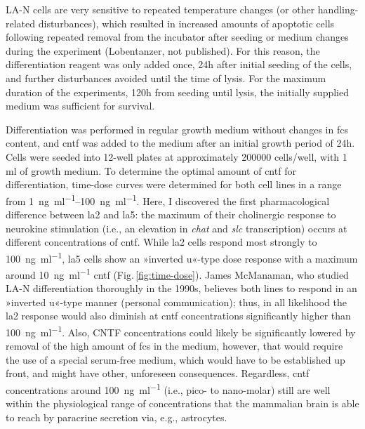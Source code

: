 \begin{method}
LA-N cells are very sensitive to repeated temperature changes (or other handling-related disturbances), which resulted in increased amounts of apoptotic cells following repeated removal from the incubator after seeding or medium changes during the experiment (Lobentanzer, not published). For this reason, the differentiation reagent was only added once, 24h after initial seeding of the cells, and further disturbances avoided until the time of lysis. For the maximum duration of the experiments, 120h from seeding until lysis, the initially supplied medium was sufficient for survival.

Differentiation was performed in regular growth medium without changes in \ac{fcs} content, and \ac{cntf} was added to the medium after an initial growth period of 24h. Cells were seeded into 12-well plates at approximately \num{200000} cells/well, with 1 ml of growth medium. To determine the optimal amount of \ac{cntf} for differentiation, time-dose curves were determined for both cell lines in a range from \SIrange{1}{100}{\nano\gram\per\milli\litre}. Here, I discovered the first pharmacological difference between \ac{la2} and \ac{la5}: the maximum of their cholinergic response to neurokine stimulation (i.e., an elevation in \textit{\ac{chat}} and \textit{\ac{slc}} transcription) occurs at different concentrations of \ac{cntf}. While \ac{la2} cells respond most strongly to \SI{100}{\nano\gram\per\milli\litre}, \ac{la5} cells show an »inverted u«-type dose response with a maximum around \SI{10}{\nano\gram\per\milli\litre} \ac{cntf} (Fig.\,\ref{fig:time-dose}). James McManaman, who studied LA-N differentiation thoroughly in the 1990s\cite{McManaman1991}, believes both lines to respond in an »inverted u«-type manner (personal communication); thus, in all likelihood the \ac{la2} response would also diminish at \ac{cntf} concentrations significantly higher than \SI{100}{\nano\gram\per\milli\litre}. Also, CNTF concentrations could likely be significantly lowered by removal of the high amount of \ac{fcs} in the medium, however, that would require the use of a special serum-free medium, which would have to be established up front, and might have other, unforeseen consequences. Regardless, \ac{cntf} concentrations around \SI{100}{\nano\gram\per\milli\litre} (i.e., pico- to nano-molar) still are well within the physiological range of concentrations that the mammalian brain is able to reach by paracrine secretion via, e.g., astrocytes\cite{Sun2016}.

\end{method}

